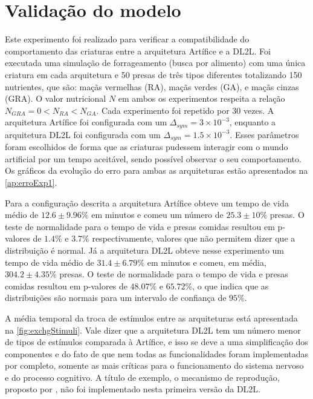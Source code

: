 \section{Validação do modelo}
\label{sec:validacao}
Este experimento foi realizado para verificar a compatibilidade do comportamento das criaturas entre a arquitetura Artífice e a DL2L. Foi executada uma simulação de forrageamento (busca por alimento) com uma única criatura em cada arquitetura e 50 presas de três tipos diferentes totalizando 150 nutrientes, que são: maçãs vermelhas (RA), maçãs verdes (GA), e maçãs cinzas (GRA). O valor nutricional $N$ em ambos os experimentos respeita a relação $N_{GRA} = 0 < N_{RA} < N_{GA} $. Cada experimento foi repetido por 30 vezes. A arquitetura Artífice foi configurada com um $\Delta_{sym} = 3 \times 10^{-3}$, enquanto a arquitetura DL2L foi configurada com um $\Delta_{sym} = 1.5 \times 10^{-3}$. Esses parâmetros foram escolhidos de forma que as criaturas pudessem interagir com o mundo artificial por um tempo aceitável, sendo possível observar o seu comportamento. Os gráficos da evolução do erro para ambas as arquiteturas estão apresentados na \autoref{ap:erroExp1}.

Para a configuração descrita a arquitetura Artífice obteve um tempo de vida médio de $12.6 \pm 9.96\%$ em minutos e comeu um número de $25.3 \pm 10\%$ presas. O teste de normalidade para o tempo de vida e presas comidas resultou em p-valores de $1.4\%$ e $3.7\%$ respectivamente, valores que não permitem dizer que a distribuição é normal. Já a arquitetura DL2L obteve nesse experimento um tempo de vida médio de $31.4 \pm 6.79\%$ em minutos e comeu, em média, $304.2 \pm 4.35\%$ presas. O teste de normalidade para o tempo de vida e presas comidas resultou em p-valores de $48.07\%$ e $65.72\%$, o que indica que as distribuições são normais para um intervalo de confiança de $95\%$.

A média temporal da troca de estímulos entre as arquiteturas está apresentada na \autoref{fig:exchgStimuli}. Vale dizer que a arquitetura DL2L tem um número menor de tipos de estímulos comparada à Artífice, e isso se deve a uma simplificação dos componentes e do fato de que nem todas as funcionalidades foram implementadas por completo, somente as mais críticas para o funcionamento do sistema nervoso e do processo cognitivo. A título de exemplo, o mecanismo de reprodução, proposto por , não foi implementado nesta primeira versão da DL2L.

